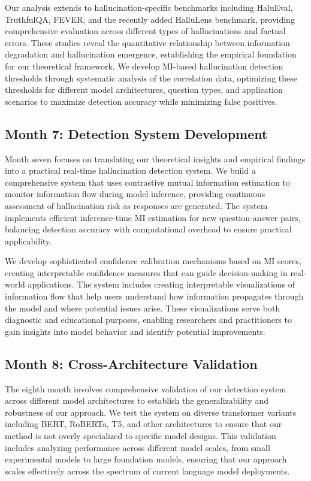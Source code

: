 \documentclass[11pt, oneside]{book}
\theoremstyle{plain}
\theoremstyle{definition}
\theoremstyle{remark}
\begin{document}
Our analysis extends to hallucination-specific benchmarks including HaluEval, TruthfulQA, FEVER, and the recently added HalluLens benchmark, providing comprehensive evaluation across different types of hallucinations and factual errors. These studies reveal the quantitative relationship between information degradation and hallucination emergence, establishing the empirical foundation for our theoretical framework. We develop MI-based hallucination detection thresholds through systematic analysis of the correlation data, optimizing these thresholds for different model architectures, question types, and application scenarios to maximize detection accuracy while minimizing false positives.

\subsection{Month 7: Detection System Development}

Month seven focuses on translating our theoretical insights and empirical findings into a practical real-time hallucination detection system. We build a comprehensive system that uses contrastive mutual information estimation to monitor information flow during model inference, providing continuous assessment of hallucination risk as responses are generated. The system implements efficient inference-time MI estimation for new question-answer pairs, balancing detection accuracy with computational overhead to ensure practical applicability.

We develop sophisticated confidence calibration mechanisms based on MI scores, creating interpretable confidence measures that can guide decision-making in real-world applications. The system includes creating interpretable visualizations of information flow that help users understand how information propagates through the model and where potential issues arise. These visualizations serve both diagnostic and educational purposes, enabling researchers and practitioners to gain insights into model behavior and identify potential improvements.

\subsection{Month 8: Cross-Architecture Validation}

The eighth month involves comprehensive validation of our detection system across different model architectures to establish the generalizability and robustness of our approach. We test the system on diverse transformer variants including BERT, RoBERTa, T5, and other architectures to ensure that our method is not overly specialized to specific model designs. This validation includes analyzing performance across different model scales, from small experimental models to large foundation models, ensuring that our approach scales effectively across the spectrum of current language model deployments.
\end{document}
